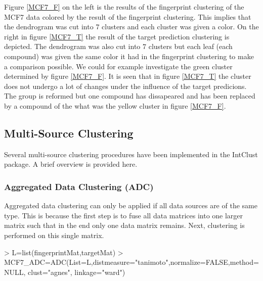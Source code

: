 \documentclass[a4paper]{article}
\begin{document}
\noindent Figure \ref{MCF7_F} on the left is the results of the fingerprint
clustering of the MCF7 data colored by the result of the fingerprint clustering.
This implies that the dendrogram was cut into $7$ clusters and each cluster was
given a color. On the right in figure \ref{MCF7_T} the result of the target prediction
clustering is depicted. The dendrogram was also cut into $7$ clusters but each
leaf (each compound) was given the same color it had in the fingerprint
clustering to make a comparison possible. We could for example investigate the
green cluster determined by figure \ref{MCF7_F}. It is seen that in figure
\ref{MCF7_T} the cluster does not undergo a lot of changes under the influence
of the target predicions. The group is reformed but one compound has dissapeared
and has been replaced by a compound of the what was the yellow cluster in figure
\ref{MCF7_F}.
\subsection{Multi-Source Clustering}
Several multi-source clustering procedures have been implemented in the IntClust
package. A brief overview is provided here.
\subsubsection{Aggregated Data Clustering (ADC)}
Aggregated data clustering can only be applied if all data sources are of the
same type. This is because the first step is to fuse all data matrices into one
larger matrix such that in the end only one data matrix remains. Next,
clustering is performed on this single matrix.
\begin{Schunk}
\begin{Sinput}
> L=list(fingerprintMat,targetMat)
> MCF7_ADC=ADC(List=L,distmeasure="tanimoto",normalize=FALSE,method=NULL,
              clust="agnes", linkage="ward")
\end{Sinput}
\end{Schunk}
\end{document}
